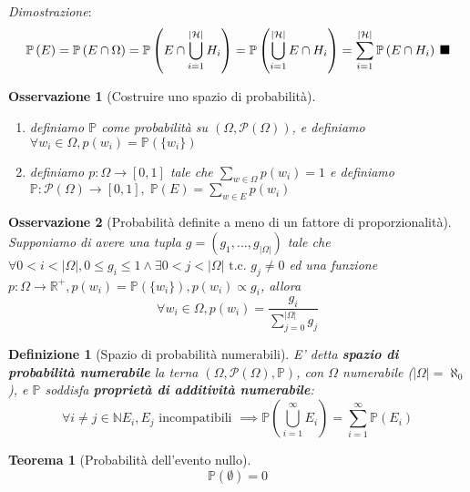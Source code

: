 \documentclass{article}
\newtheorem{theorem}{Teorema}[section]
\newtheorem{definition}{Definizione}[section]
\newtheorem{osservation}{Osservazione}[section]
\newcommand{\qed}{\rule{0.7em}{0.7em}}
\newcommand{\PS}[1]{\mathcal{P}\left(#1\right)}
\newcommand{\Prob}[1]{\mathbb{P}\left(#1\right)}
\begin{document}
    \textit{Dimostrazione}:
        $$\Prob{E} = \Prob{E \cap \Omega} = \Prob{E \cap \bigcup_{i=1}^{|\mathcal{H}|} H_i} = 
            \Prob{\bigcup_{i=1}^{|\mathcal{H}|} E \cap H_i} = \sum_{i=1}^{|\mathcal{H}|} \Prob{E \cap H_i} \; \qed$$
    \begin{osservation}[Costruire uno spazio di probabilità]
        \begin{enumerate}
            \item definiamo $\mathbb{P}$ come probabilità su $\left(\Omega, \PS{\Omega}\right)$, e 
                definiamo $\forall w_i \in \Omega, p\left(w_i\right) = \Prob{\{w_i\}}$
            \item definiamo $p: \Omega \to \left[0,1\right]$ tale che $\sum_{w\in \Omega}p\left(w_i\right) = 1$ e definiamo 
                $\mathbb{P}: \PS{\Omega} \to \left[0,1\right], \; \Prob{E} = \sum_{w \in E} p\left(w_i\right)$
        \end{enumerate}
    \end{osservation}
    \begin{osservation}[Probabilità definite a meno di un fattore di proporzionalità]
        Supponiamo di avere una tupla $g = \left(g_1, ..., g_{|\Omega|}\right)$ tale che
        $\forall 0 < i < |\Omega|, 0 \leq g_i \leq 1 \land \exists 0 < j < |\Omega| \textrm{ t.c. } g_j \neq 0$ 
        ed una funzione $p: \Omega \to \mathbb{R}^+, p\left(w_i\right) = \Prob{\{w_i\}}, p\left(w_i\right) \propto g_i$, allora 
        $$\forall w_i \in \Omega, p\left(w_i\right) = \frac{g_i}{\sum_{j=0}^|\Omega| g_j}$$
    \end{osservation}
    \begin{definition}[Spazio di probabilità numerabili]
        E' detta \textbf{spazio di probabilità numerabile} la terna 
        $\left(\Omega, \mathcal{P}\left(\Omega\right), \mathbb{P}\right)$, con 
        $\Omega$ numerabile ($|\Omega| = \aleph_0$), e $\mathbb{P}$ soddisfa \textbf{proprietà di 
        additività numerabile}:
        $$\forall i \neq j \in \mathbb{N} E_i, E_j \textrm{ incompatibili } \implies 
            \Prob{\bigcup_{i=1}^\infty E_i} = \sum_{i=1}^\infty \Prob{E_i}$$
    \end{definition}
    \begin{theorem}[Probabilità dell'evento nullo]
        $$\Prob{\emptyset} = 0$$
    \end{theorem}
\end{document}

